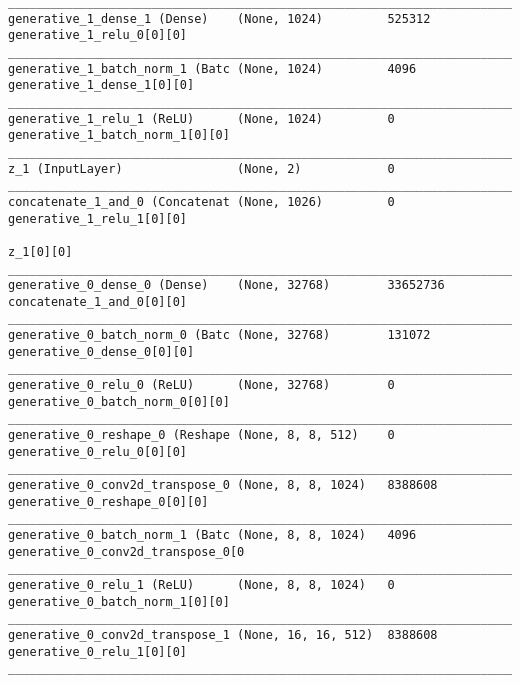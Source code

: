 \begin{lstlisting}[caption={CelebA-VLAE-GAN Decoder},captionpos=b,basicstyle=\tiny, label={lst:mnist-vlae-gan-decoder}]
__________________________________________________________________________________________________
generative_1_dense_1 (Dense)    (None, 1024)         525312      generative_1_relu_0[0][0]
__________________________________________________________________________________________________
generative_1_batch_norm_1 (Batc (None, 1024)         4096        generative_1_dense_1[0][0]
__________________________________________________________________________________________________
generative_1_relu_1 (ReLU)      (None, 1024)         0           generative_1_batch_norm_1[0][0]
__________________________________________________________________________________________________
z_1 (InputLayer)                (None, 2)            0
__________________________________________________________________________________________________
concatenate_1_and_0 (Concatenat (None, 1026)         0           generative_1_relu_1[0][0]
                                                                 z_1[0][0]
__________________________________________________________________________________________________
generative_0_dense_0 (Dense)    (None, 32768)        33652736    concatenate_1_and_0[0][0]
__________________________________________________________________________________________________
generative_0_batch_norm_0 (Batc (None, 32768)        131072      generative_0_dense_0[0][0]
__________________________________________________________________________________________________
generative_0_relu_0 (ReLU)      (None, 32768)        0           generative_0_batch_norm_0[0][0]
__________________________________________________________________________________________________
generative_0_reshape_0 (Reshape (None, 8, 8, 512)    0           generative_0_relu_0[0][0]
__________________________________________________________________________________________________
generative_0_conv2d_transpose_0 (None, 8, 8, 1024)   8388608     generative_0_reshape_0[0][0]
__________________________________________________________________________________________________
generative_0_batch_norm_1 (Batc (None, 8, 8, 1024)   4096        generative_0_conv2d_transpose_0[0
__________________________________________________________________________________________________
generative_0_relu_1 (ReLU)      (None, 8, 8, 1024)   0           generative_0_batch_norm_1[0][0]
__________________________________________________________________________________________________
generative_0_conv2d_transpose_1 (None, 16, 16, 512)  8388608     generative_0_relu_1[0][0]
__________________________________________________________________________________________________

\end{lstlisting}
